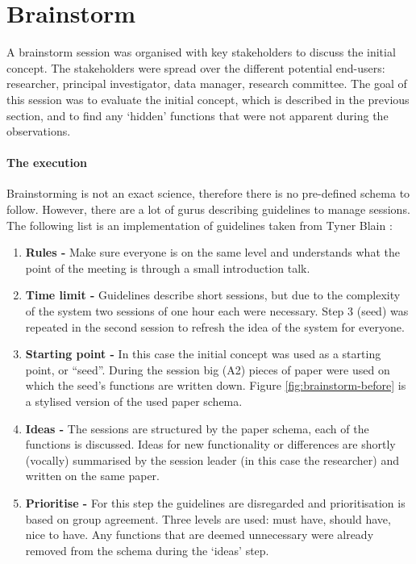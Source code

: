 \section{Brainstorm}
\label{brainstorm}

A brainstorm session was organised with key stakeholders to discuss the initial concept.
The stakeholders were spread over the different potential end-users: researcher, principal investigator, data manager, research committee.
The goal of this session was to evaluate the initial concept, which is described in the previous section, and to find any `hidden' functions that were not apparent during the observations.

\paragraph{The execution}
Brainstorming is not an exact science, therefore there is no pre-defined schema to follow.
However, there are a lot of gurus describing guidelines to manage sessions.
The following list is an implementation of guidelines taken from Tyner Blain \cite{brainstormWebsite}:

\begin{enumerate}
	\item \textbf{Rules -} Make sure everyone is on the same level and understands what the point of the meeting is through a small introduction talk.
	\item \textbf{Time limit -} Guidelines describe short sessions, but due to the complexity of the system two sessions of one hour each were necessary.
		Step 3 (seed) was repeated in the second session to refresh the idea of the system for everyone.
	\item \textbf{Starting point -} In this case the initial concept was used as a starting point, or ``seed''.
		During the session big (A2) pieces of paper were used on which the seed's functions are written down. Figure \ref{fig:brainstorm-before} is a stylised version of the used paper schema.
	\item \textbf{Ideas -} The sessions are structured by the paper schema, each of the functions is discussed.
		Ideas for new functionality or differences are shortly (vocally) summarised by the session leader (in this case the researcher) and written on the same paper.
	\item \textbf{Prioritise -} For this step the guidelines are disregarded and prioritisation is based on group agreement.
		Three levels are used: must have, should have, nice to have.
		Any functions that are deemed unnecessary were already removed from the schema during the `ideas' step.
\end{enumerate}

